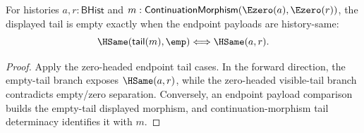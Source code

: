 \begin{proposition}
\label{prop:continuation-morphism-e0-source-e0-target-tail-empty-iff}
For histories $a,r:\mathsf{BHist}$ and
$m:\mathsf{ContinuationMorphism}(\Ezero(a),\Ezero(r))$, the displayed tail is
empty exactly when the endpoint payloads are history-same:
$$
\HSame(\mathsf{tail}(m),\emp)\Longleftrightarrow\HSame(a,r).
$$
\end{proposition}
\begin{proof}
Apply the zero-headed endpoint tail cases. In the forward direction, the
empty-tail branch exposes $\HSame(a,r)$, while the zero-headed visible-tail
branch contradicts empty/zero separation. Conversely, an endpoint payload
comparison builds the empty-tail displayed morphism, and continuation-morphism
tail determinacy identifies it with $m$.
\end{proof}

